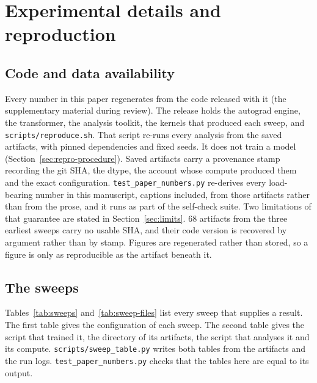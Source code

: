 \section{Experimental details and reproduction}

\subsection{Code and data availability}
\label{sec:availability}

Every number in this paper regenerates from the code released with it (the supplementary
material during review). The release holds the autograd engine, the transformer, the analysis
toolkit, the kernels that produced each sweep, and \texttt{scripts/reproduce.sh}. That script
re-runs every analysis from the saved artifacts, with pinned dependencies and fixed seeds. It
does not train a model (Section~\ref{sec:repro-procedure}). Saved artifacts carry a provenance stamp
recording the git SHA, the dtype, the account whose compute produced them and the exact
configuration. \texttt{test\_paper\_numbers.py} re-derives every load-bearing number in this
manuscript, captions included, from those artifacts rather than from the prose, and it runs as
part of the self-check suite. Two limitations of that guarantee are stated in
Section~\ref{sec:limits}. $68$ artifacts from the three earliest sweeps carry no usable SHA,
and their code version is recovered by argument rather than by stamp. Figures are regenerated
rather than stored, so a figure is only as reproducible as the artifact beneath it.

\subsection{The sweeps}
\label{sec:sweeps}

Tables~\ref{tab:sweeps} and~\ref{tab:sweep-files} list every sweep that supplies a result. The
first table gives the configuration of each sweep. The second table gives the script that
trained it, the directory of its artifacts, the script that analyses it and its compute.
\texttt{scripts/sweep\_table.py} writes both tables from the artifacts and the run logs.
\texttt{test\_paper\_numbers.py} checks that the tables here are equal to its output.

